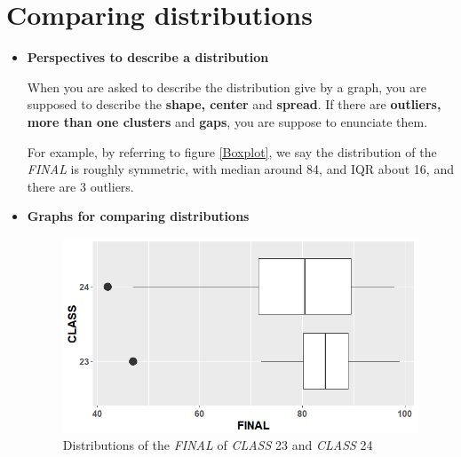 \documentclass[a4paper, 12pt,twoside]{book}
\begin{document}
\section{Comparing distributions}
\begin{itemize}
\item \textbf{Perspectives to describe a distribution}

When you are asked to describe the distribution give by a graph, you are supposed to describe the \textbf{shape, center} and \textbf{spread}. If there are \textbf{outliers, more than one clusters} and \textbf{gaps}, you are suppose to enunciate them.
\vspace{0.6cm}

For example, by referring to figure \ref{Boxplot}, we say the distribution of the \textit{FINAL} is roughly symmetric, with median around 84, and IQR about 16, and there are 3 outliers.

\item \textbf{Graphs for comparing distributions}

\begin{figure}[H]
\centering
\includegraphics[scale=0.5]{BxoplotComparison.png}
\caption{Distributions of the \textit{FINAL} of \textit{CLASS} 23 and \textit{CLASS} 24}
\label{BxoplotComparison}
\end{figure}


\end{itemize}
\end{document}
